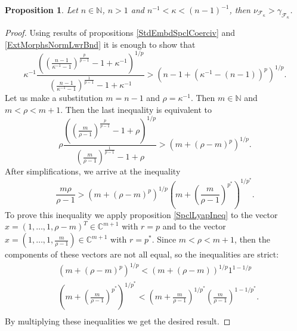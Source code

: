 \documentclass[12pt]{article}
\newtheorem{proposition}[theorem]{Proposition}
\begin{document}
\begin{proposition}\label{CompStdEmbdCoercvAndExtMorphsNormInf}
    Let $n\in\mathbb{N}$, $n>1$ and $n^{-1}<\kappa<(n-1)^{-1}$, then
    $\nu_{\mathcal{F}_{\kappa}}>\gamma_{\mathcal{F}_{\kappa}}$.
\end{proposition}
\begin{proof}
    Using results of propositions \ref{StdEmbdSpclCoerciv} 
    and \ref{ExtMorphsNormLwrBnd} it is enough to show that
    \[
        \kappa^{-1}
        \frac{
            \left(
                \left(\frac{n-1}{\kappa^{-1}-1}
                \right)^{\frac{p}{p-1}}
                -1+\kappa^{-1}
            \right)^{1/p}
        }{
            \left(\frac{n-1}{\kappa^{-1}-1}
            \right)^{\frac{1}{p-1}}
            -1+\kappa^{-1}
        }
        >
        (n-1+(\kappa^{-1}-(n-1))^p)^{1/p}.
    \]
    Let us make a substitution $m=n-1$ and $\rho=\kappa^{-1}$. 
    Then $m\in\mathbb{N}$ and $m<\rho<m+1$. Then the last inequality is 
    equivalent to
    \[
        \rho
        \frac{
            \left(
                \left(\frac{m}{\rho-1}
                \right)^{\frac{p}{p-1}}
                -1+\rho
            \right)^{1/p}
        }{
            \left(\frac{m}{\rho-1}
            \right)^{\frac{1}{p-1}}
            -1+\rho
        }
        >
        (m+(\rho-m)^p)^{1/p}.
    \] 
    After simplifications, we arrive at the inequality
    \[
        \frac{m\rho}{\rho-1}
        >
        (m+(\rho-m)^p)^{1/p}
        \left(
            m+\left(\frac{m}{\rho-1}\right)^{p^*}
        \right)^{1/p^*}.
    \]
    To prove this inequality we apply proposition \ref{SpclLyapIneq} to the 
    vector $x=(1,\ldots,1,\rho-m)^T\in\mathbb{C}^{m+1}$ with $r=p$ and to the 
    vector $x=(1,\ldots,1,\frac{m}{\rho-1})\in\mathbb{C}^{m+1}$ with $r=p^*$. 
    Since $m<\rho<m+1$, then the components of these vectors are not all equal,
    so the inequalities are strict:
    \[
    \begin{aligned}
        &(m+(\rho-m)^p)^{1/p}
        <
        (m+(\rho-m))^{1/p} 1^{1-1/p}\\
        &\left(m+\left(\frac{m}{\rho-1}\right)^{p^*}\right)^{1/p^*}
        <
        \left(m+\frac{m}{\rho-1}\right)^{1/p^*}
        \left(\frac{m}{\rho-1}\right)^{1-1/p^*}.\\
    \end{aligned}
    \]
    By multiplying these inequalities we get the desired result.
\end{proof}
\end{document}

